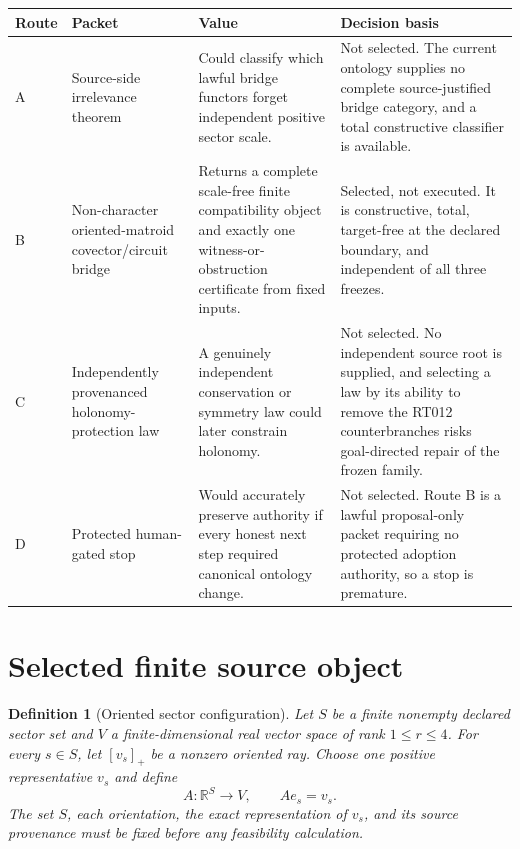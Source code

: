 \documentclass[11pt]{article}
\newtheorem{definition}{Definition}
\newcommand{\R}{\mathbb{R}}
\begin{document}
\begin{longtable}{>{\raggedright\arraybackslash}p{}
                  >{\raggedright\arraybackslash}p{}
                  >{\raggedright\arraybackslash}p{}
                  >{\raggedright\arraybackslash}p{}}
\toprule
Route & Packet & Value & Decision basis\\
\midrule
\endhead
A & Source-side irrelevance theorem
  & Could classify which lawful bridge functors forget independent positive
    sector scale.
  & Not selected.  The current ontology supplies no complete source-justified
    bridge category, and a total constructive classifier is available.\\
B & Non-character oriented-matroid covector/circuit bridge
  & Returns a complete scale-free finite compatibility object and exactly one
    witness-or-obstruction certificate from fixed inputs.
  & Selected, not executed.  It is constructive, total, target-free at the
    declared boundary, and independent of all three freezes.\\
C & Independently provenanced holonomy-protection law
  & A genuinely independent conservation or symmetry law could later constrain
    holonomy.
  & Not selected.  No independent source root is supplied, and selecting a law
    by its ability to remove the RT012 counterbranches risks goal-directed
    repair of the frozen family.\\
D & Protected human-gated stop
  & Would accurately preserve authority if every honest next step required
    canonical ontology change.
  & Not selected.  Route B is a lawful proposal-only packet requiring no
    protected adoption authority, so a stop is premature.\\
\bottomrule
\end{longtable}

\section{Selected finite source object}

\begin{definition}[Oriented sector configuration]
Let \(S\) be a finite nonempty declared sector set and \(V\) a finite-dimensional
real vector space of rank \(1\le r\le4\).  For every \(s\in S\), let
\([v_s]_+\) be a nonzero oriented ray.  Choose one positive representative
\(v_s\) and define
\[
  A:\R^S\longrightarrow V,\qquad A e_s=v_s .
\]
The set \(S\), each orientation, the exact representation of \(v_s\), and its
source provenance must be fixed before any feasibility calculation.
\end{definition}
\end{document}
